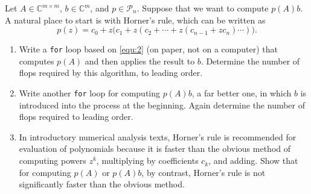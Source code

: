\documentclass{ctexart}
\begin{document}
\begin{problem}\label{pro:2}
  Let \(A \in \mathbb{C}^{m \times m}\), \(b \in \mathbb{C}^m\), and \(p \in \mathcal{P}_n\).
  Suppose that we want to compute \(p(A)b\). A natural place to start is with Horner’s rule, which can be written as
  \begin{equation}\label{equ:2}
    p(z) = c_0 + z\bigl(c_1 + z(c_2 + \cdots + z(c_{n-1} + z c_n)\cdots)\bigr).
  \end{equation}

  \begin{enumerate}[label=(\alph*)]
    \item Write a \texttt{for} loop based on \eqref{equ:2} (on paper, not on a computer) that computes \(p(A)\) and then applies the result to \(b\). Determine the number of flops required by this algorithm, to leading order.

    \item Write another \texttt{for} loop for computing \(p(A)b\), a far better one, in which \(b\) is introduced into the process at the beginning. Again determine the number of flops required to leading order.

    \item In introductory numerical analysis texts, Horner’s rule is recommended for evaluation of polynomials because it is faster than the obvious method of computing powers \(z^k\), multiplying by coefficients \(c_k\), and adding. Show that for computing \(p(A)\) or \(p(A)b\), by contrast, Horner’s rule is not significantly faster than the obvious method.
  \end{enumerate}
\end{problem}
\end{document}
